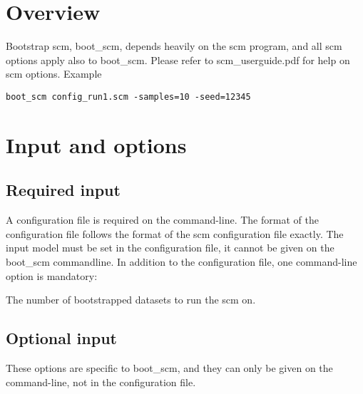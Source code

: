 



\maketitle


\section{Overview}

Bootstrap scm, boot\_scm, depends heavily on the scm program, and all scm options apply also to boot\_scm. Please refer to scm\_userguide.pdf for help on scm options.
Example
\begin{verbatim}
boot_scm config_run1.scm -samples=10 -seed=12345
\end{verbatim}

\section{Input and options}

\subsection{Required input}

A configuration file is required on the command-line. The format of the configuration file follows the format of the scm configuration file exactly. The input model must be set in the configuration file, it cannot be given on the boot\_scm commandline. In addition to the configuration file, one command-line option is mandatory:

\begin{optionlist}
The number of bootstrapped datasets to run the scm on. 
\nextopt
\end{optionlist}


\subsection{Optional input}

These options are specific to boot\_scm, and they can only be given on the command-line, not in the configuration file.

